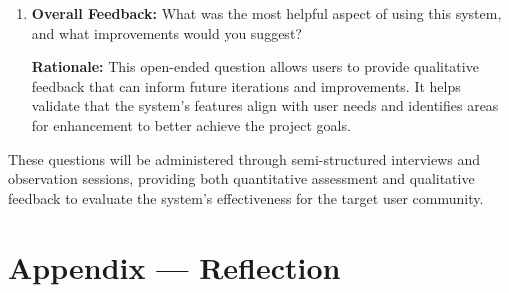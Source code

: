 \documentclass[12pt, titlepage]{article}
\begin{document}
\begin{enumerate}
    \textbf{Rationale:} This question provides an overall assessment of user
    satisfaction and perceived value, indicating whether the system successfully
    meets the needs of the primary stakeholder group. A positive recommendation
    suggests the system effectively addresses the identified gaps in existing
    assistive technologies.
    
    \item \textbf{Overall Feedback:} What was the most helpful aspect of using
    this system, and what improvements would you suggest?
    
    \textbf{Rationale:} This open-ended question allows users to provide
    qualitative feedback that can inform future iterations and improvements. It
    helps validate that the system's features align with user needs and
    identifies areas for enhancement to better achieve the project goals.
\end{enumerate}

These questions will be administered through semi-structured interviews and
observation sessions, providing both quantitative assessment and qualitative
feedback to evaluate the system's effectiveness for the target user community.

\newpage



\newpage
\section*{Appendix --- Reflection}
\end{document}
